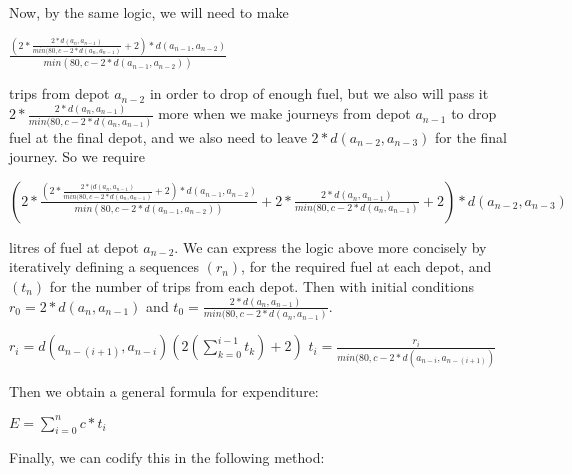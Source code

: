 \documentclass{homework}
\begin{document}
\newline\newline
Now, by the same logic, we will need to make 
\newline\begin{center}
\large $\frac{(2*\frac{2*d(a_n, a_{n-1})}{min(80, c - 2*d(a_n, a_{n-1})} + 2)*d(a_{n-1},a_{n-2})}{min(80, c - 2*d(a_{n-1},a_{n-2}))}$ 
\newline\end{center}
trips from depot $a_{n-2}$ in order to drop of enough fuel, but we also will pass it $2*\frac{2*d(a_n, a_{n-1})}{min(80, c - 2*d(a_n, a_{n-1})}$ more when we make journeys from depot $a_{n-1}$ to drop fuel at the final depot, and we also need to leave $2*d(a_{n-2},a_{n-3})$ for the final journey. So we require 
\newline\begin{center}
\large $(2*\frac{(2*\frac{2*(d(a_n, a_{n-1})}{min(80, c - 2*d(a_n, a_{n-1})} + 2)*d(a_{n-1},a_{n-2})}{min(80, c - 2*d(a_{n-1},a_{n-2}))} + 2*\frac{2*d(a_n, a_{n-1})}{min(80, c - 2*d(a_n, a_{n-1})} + 2)*d(a_{n-2},a_{n-3})$
\newline\end{center}
litres of fuel at depot $a_{n-2}$. 
\newline\newline
We can express the logic above more concisely by iteratively defining a sequences $(r_n)$, for the required fuel at each depot, and $(t_n)$ for the number of trips from each depot. Then with initial conditions $r_0 = 2*d(a_n, a_{n-1})$ and $t_0 = \frac{2*d(a_n, a_{n-1})}{min(80, c - 2*d(a_n, a_{n-1})}$. 
\newline\begin{center}
\large$r_i = d(a_{n-(i+1)}, a_{n-i})(2(\sum_{k=0}^{i-1}t_k)+2)$\newline\newline
\large$t_i = \frac{r_i}{min(80,c-2*d(a_{n-i},a_{n-(i+1)})}$\newline
\end{center}
Then we obtain a general formula for expenditure:
\begin{center}
\large $E = \sum_{i=0}^{n}c*t_i$
\end{center}
Finally, we can codify this in the following method:
\end{document}
